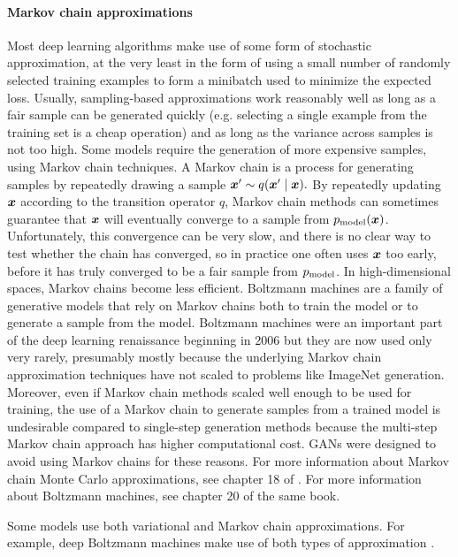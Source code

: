 \paragraph{Markov chain approximations}
Most deep learning algorithms make use of some form of stochastic approximation,
at the very least in the form of using a small number of randomly selected training
examples to form a minibatch used to minimize the expected loss.
Usually, sampling-based approximations work reasonably well as long as a fair sample
can be generated quickly (e.g. selecting a single example from the training set
is a cheap operation) and as long as the variance across samples is not too high.
Some models require the generation of more expensive samples, using Markov chain
techniques.
A Markov chain is a process for generating samples by repeatedly drawing a sample
${\bm{x}}' \sim q({\bm{x}}' \mid {\bm{x}}).$
By repeatedly updating ${\bm{x}}$ according to the transition operator $q$, Markov chain
methods can sometimes guarantee that ${\bm{x}}$ will eventually converge to a sample from
$p_{\rm{model}}({\bm{x}})$.
Unfortunately, this convergence can be very slow, and there is no clear way to test
whether the chain has converged, so in practice one often uses ${\bm{x}}$ too early, before
it has truly converged to be a fair sample from $p_{\rm{model}}$.
In high-dimensional spaces, Markov chains become less efficient.
Boltzmann machines \citep{Fahlman83,Ackley85,Hinton-Boltzmann,Hinton86a} are a
family of generative models that rely on Markov chains both to train the model
or to generate a sample from the model.
Boltzmann machines were an important part of the deep learning renaissance beginning
in 2006 \citep{Hinton06,hinton2007learning} but they are now used only very rarely,
presumably mostly because the underlying Markov chain approximation techniques have
not scaled to problems like ImageNet generation.
Moreover, even if Markov chain methods scaled well enough to be used for training,
the use of a Markov chain to generate samples from a trained model is undesirable
compared to single-step generation methods because the multi-step Markov chain
approach has higher computational cost.
GANs were designed to avoid using Markov chains for these reasons.
For more information about Markov chain Monte Carlo approximations, see chapter 18 of
\citet{Goodfellow-et-al-2016}.
For more information about Boltzmann machines, see chapter 20 of the same book.

Some models use both variational and Markov chain approximations.
For example, deep Boltzmann machines make use of both types of
approximation \citep{SalHinton09}.

